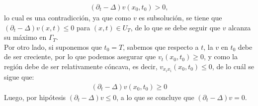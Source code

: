 \begin{homeworkProblem}
\begin{solucion}
    \begin{align*}
      (\partial_t-\Delta)v(x_0,t_0)> 0,
    \end{align*}
    lo cual es una contradicción, ya que como $v$ es subsolución, se tiene que $(\partial_t-\Delta)v(x,t)\leq 0$ para $(x,t)\in U_T$, de lo que se debe seguir que $v$ alcanza su máximo en $\Gamma_T$.\\
    Por otro lado, si suponemos que $t_0=T$, sabemos que respecto a $t$, la $v$ en $t_0$ debe de ser creciente, por lo que podemos asegurar que $v_t(x_0,t_0)\geq 0$, y como la región debe de ser relativamente cóncava, es decir, $v_{x_ix_i}(x_0,t_0)\leq 0$, de lo cuál se sigue que:
    \begin{align*}
      (\partial_t-\Delta)v(x_0,t_0)\geq 0
    \end{align*}
    Luego, por hipótesis $(\partial_{t}-\Delta)v\leq 0$, a lo que se concluye que $(\partial_t-\Delta)v=0$.
  \end{solucion}  
\end{homeworkProblem}
